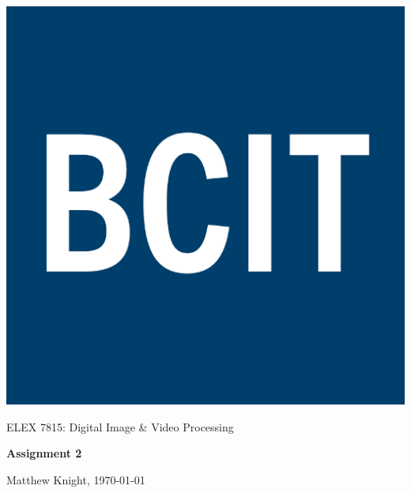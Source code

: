 \documentclass[12pt]{article}
\begin{document}
 

\thispagestyle{titlePage}

\includegraphics[scale=0.12]{BCIT}
\bigskip

\begin{center}
    
    {\fontsize{24pt}{6pt}\selectfont ELEX 7815: Digital Image \& Video Processing}
    
    \vspace{12pt}
    
    {\fontsize{28pt}{12pt}\selectfont\bfseries Assignment 2}
    
    \vspace{12pt}
    
    {\fontsize{16pt}{12pt}\selectfont Matthew Knight, \today}
    
    \vspace{24pt}

\end{center}

\pagebreak

\pagestyle{neilReport}


\end{document}
